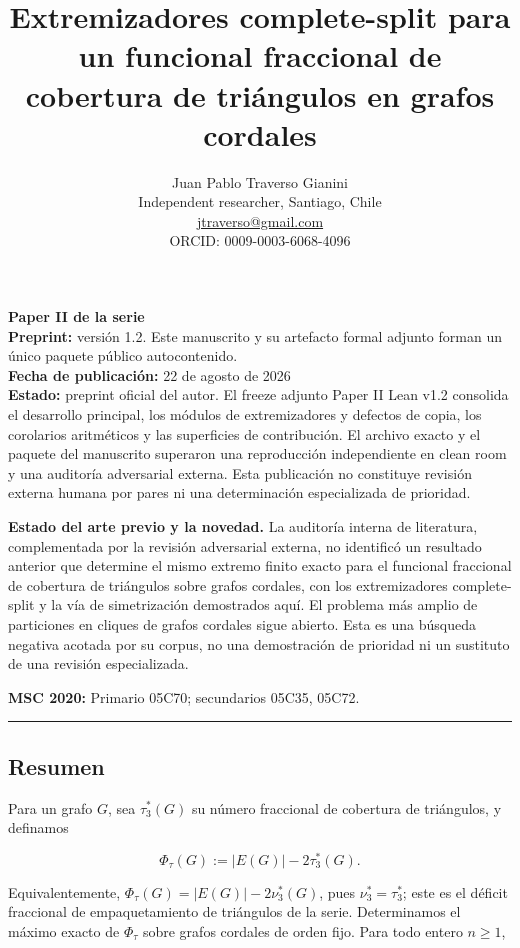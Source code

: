 \documentclass[
  spanish,
  11pt,
  a4paper,
]{article}
\title{Extremizadores complete-split para un funcional fraccional de cobertura de triángulos en grafos cordales}
\author{Juan Pablo Traverso Gianini\\
\small Independent researcher, Santiago, Chile\\
\small \href{mailto:jtraverso@gmail.com}{jtraverso@gmail.com}\\
\small ORCID: 0009-0003-6068-4096}
\date{}
\begin{document}
\sloppy
\raggedbottom
\maketitle

\textbf{Paper II de la serie}\\
\textbf{Preprint:} versión 1.2. Este manuscrito y su artefacto formal adjunto forman un único paquete público autocontenido.\\
\textbf{Fecha de publicación:} 22 de agosto de 2026\\
\textbf{Estado:} preprint oficial del autor. El freeze adjunto Paper II Lean v1.2 consolida el desarrollo principal, los módulos de extremizadores y defectos de copia, los corolarios aritméticos y las superficies de contribución. El archivo exacto y el paquete del manuscrito superaron una reproducción independiente en clean room y una auditoría adversarial externa. Esta publicación no constituye revisión externa humana por pares ni una determinación especializada de prioridad.

\textbf{Estado del arte previo y la novedad.} La auditoría interna de literatura, complementada por la revisión adversarial externa, no identificó un resultado anterior que determine el mismo extremo finito exacto para el funcional fraccional de cobertura de triángulos sobre grafos cordales, con los extremizadores complete-split y la vía de simetrización demostrados aquí. El problema más amplio de particiones en cliques de grafos cordales sigue abierto. Esta es una búsqueda negativa acotada por su corpus, no una demostración de prioridad ni un sustituto de una revisión especializada.

\textbf{MSC 2020:} Primario 05C70; secundarios 05C35, 05C72.

\begin{center}\rule{0.5\linewidth}{0.5pt}\end{center}

\subsection{Resumen}\label{resumen}

Para un grafo \(G\), sea \(\tau_3^*(G)\) su número fraccional de cobertura de triángulos, y definamos

\[
\Phi_\tau(G):=|E(G)|-2\tau_3^*(G).
\]

Equivalentemente, \(\Phi_\tau(G)=|E(G)|-2\nu_3^*(G)\), pues \(\nu_3^*=\tau_3^*\); este es el déficit fraccional de empaquetamiento de triángulos de la serie. Determinamos el máximo exacto de \(\Phi_\tau\) sobre grafos cordales de orden fijo. Para todo entero \(n\ge1\),
\end{document}
